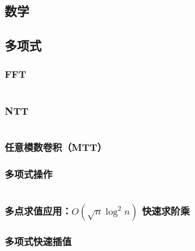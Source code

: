 \documentclass[a4paper, twoside]{article}
\begin{document}
	\begin{multicols}{2}
		\section{数学}
			
			\subsection{多项式}
				\subsubsection{FFT}
					\inputminted{cpp}{../src/math/FFT.cpp}

				\subsubsection{NTT}
					\inputminted{cpp}{../src/math/NTT.cpp}

				\subsubsection{任意模数卷积（MTT）}
					
			
				\subsubsection{多项式操作}
					\label{PolyOperation}
					\inputminted{cpp}{../src/math/多项式操作.cpp}
				
				\subsubsection{多点求值应用：$O(\sqrt n \log^2 n)$ 快速求阶乘}
					\label{fastfact}
					


				\subsubsection{多项式快速插值}
					\label{PolyFastInterpolation}
					


\end{multicols}
\end{document}
